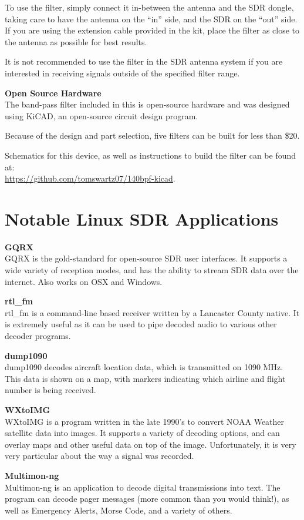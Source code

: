 \documentclass[10pt,foldmark,notumble]{leaflet}
\begin{document}
To use the filter, simply connect it in-between the antenna and the SDR dongle,
taking care to have the antenna on the ``in'' side, and the SDR on the ``out'' side.
If you are using the extension cable provided in the kit, place the filter as
close to the antenna as possible for best results.

It is not recommended to use the filter in the SDR antenna system if you
are interested in receiving signals outside of the specified filter range.

\textbf{Open Source Hardware}\\
The band-pass filter included in this is open-source hardware and was designed
using KiCAD, an open-source circuit design program.

Because of the design and part selection, five filters can be built for less
than \$20.

Schematics for this device, as well as instructions to build the filter
can be found at:\\
\url{https://github.com/tomswartz07/140bpf-kicad}.

\section{Notable Linux SDR Applications\color{red}\hrulefill\color{black}}
\textbf{GQRX}\\
GQRX is the gold-standard for open-source SDR user interfaces. It supports a
wide variety of reception modes, and has the ability to stream SDR data over
the internet. Also works on OSX and Windows.

\textbf{rtl\_fm}\\
rtl\_fm is a command-line based receiver written by a Lancaster County native.
It is extremely useful as it can be used to pipe decoded audio to various
other decoder programs.

\textbf{dump1090}\\
dump1090 decodes aircraft location data, which is transmitted on
1090 MHz. This data is shown on a map, with markers indicating which airline
and flight number is being received.

\textbf{WXtoIMG}\\
WXtoIMG is a program written in the late 1990's to convert NOAA Weather satellite
data into images. It supports a variety of decoding options, and can overlay
maps and other useful data on top of the image.
Unfortunately, it is very very particular about the way a signal was recorded.

\textbf{Multimon-ng}\\
Multimon-ng is an application to decode digital transmissions into text.
The program can decode pager messages (more common than you would think!), as
well as Emergency Alerts, Morse Code, and a variety of others.
\end{document}
